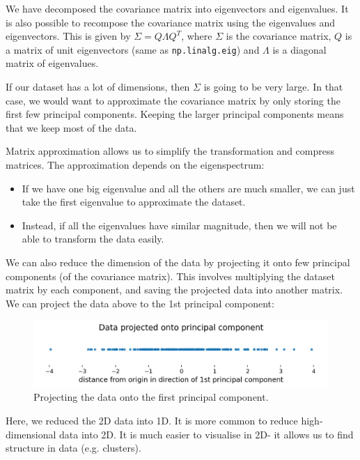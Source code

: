 \documentclass[a4paper, openany]{memoir}
\begin{document}
    We have decomposed the covariance matrix into eigenvectors and eigenvalues. It is also possible to recompose the covariance matrix using the eigenvalues and eigenvectors. This is given by $\Sigma = Q \Lambda Q^T$, where $\Sigma$ is the covariance matrix, $Q$ is a matrix of unit eigenvectors (same as \texttt{np.linalg.eig}) and $\Lambda$ is a diagonal matrix of eigenvalues.

    If our dataset has a lot of dimensions, then $\Sigma$ is going to be very large. In that case, we would want to approximate the covariance matrix by only storing the first few principal components. Keeping the larger principal components means that we keep most of the data.

    Matrix approximation allows us to simplify the transformation and compress matrices. The approximation depends on the eigenspectrum:
    \begin{itemize}
        \item If we have one big eigenvalue and all the others are much smaller, we can just take the first eigenvalue to approximate the dataset.
        \item Instead, if all the eigenvalues have similar magnitude, then we will not be able to transform the data easily.
    \end{itemize}
    We can also reduce the dimension of the data by projecting it onto few principal components (of the covariance matrix). This involves multiplying the dataset matrix by each component, and saving the projected data into another matrix. We can project the data above to the 1st principal component:
    \begin{figure}[H]
        \centering
        \includegraphics[scale=0.6]{src/3.30 Data projected onto principal component.png}
        \caption{Projecting the data onto the first principal component.}
    \end{figure}
    Here, we reduced the 2D data into 1D. It is more common to reduce high-dimensional data into 2D. It is much easier to visualise in 2D- it allows us to find structure in data (e.g. clusters).
\end{document}
